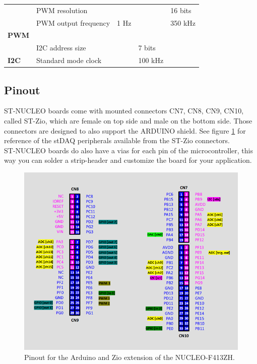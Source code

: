 \documentclass[letterpaper,10pt,english]{hitec}
\begin{document}
\begin{table}[h!]
\begin{tabular}{l|l|lll}
\cellcolor[HTML]{C0C0C0}                                 & PWM resolution                      &               &               & 16 bits       \\
\cellcolor[HTML]{C0C0C0}                                 & PWM output frequency                & 1 Hz          &               & 350 kHz       \\
\multirow{-3}{*}{\cellcolor[HTML]{C0C0C0}\textbf{PWM}}   &                                     &               &               &               \\ \hline
\cellcolor[HTML]{C0C0C0}                                 & I2C address size                    &               & 7 bits        &               \\
\multirow{-2}{*}{\cellcolor[HTML]{C0C0C0}\textbf{I2C}}   & Standard mode clock                 &               & 100 kHz       &              
\end{tabular}
\end{table}

\newpage 

\subsection{Pinout}

ST-NUCLEO boards come with mounted connectors CN7, CN8, CN9, CN10, called ST-Zio, which are female on top side and male on the bottom side. Those connectors are designed to also support the ARDUINO shield.
See figure \ref{fig:pinout} for reference of the stDAQ peripherals available from the ST-Zio connectors. \\
ST-NUCLEO boards do also have a vias for each pin of the microcontroller, this way you can solder a strip-header and customize the board for your application.

\begin{figure}[ht!]
\includegraphics[scale=0.7]{../img/nucleo_f413zh_zio_ex.png}
\caption{Pinout for the Arduino and Zio extension of the NUCLEO-F413ZH.}
\label{fig:pinout}
\end{figure}
\end{document}
